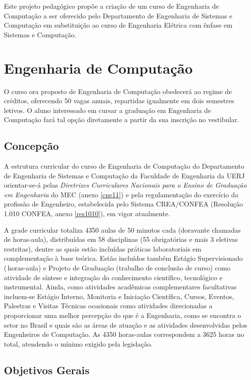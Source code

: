 Este projeto pedagógico propõe a criação de um curso de Engenharia de Computação a ser oferecido pelo Departamento de Engenharia de Sistemas e Computação em substituição ao curso de Engenharia Elétrica com ênfase em Sistemas e Computação.

\chapter{Engenharia de Computação}
O curso ora proposto de Engenharia de Computação obedecerá ao regime de créditos, oferecendo 50 vagas anuais, repartidas igualmente em dois semestres letivos. O aluno interessado em cursar a graduação em Engenharia de Computação fará tal opção diretamente a partir da sua inscrição no vestibular.

\section{Concepção}

A estrutura curricular do curso de Engenharia de Computação do Departamento de Engenharia de Sistemas e Computação da Faculdade de Engenharia da UERJ orientar-se-á pelas \textit{Diretrizes Curriculares Nacionais para o Ensino de Graduação em Engenharia} do MEC (anexo \ref{cne11}) e pela regulamentação do exercício da profissão de Engenheiro, estabelecida pelo Sistema CREA/CONFEA (Resolução 1.010 CONFEA, anexo \ref{res1010}), em vigor atualmente.

A grade curricular totaliza 4350 aulas de 50 minutos cada (doravante chamadas de horas-aula), distribuídas em 58 disciplinas (55 obrigatórias e mais 3 eletivas restritas), dentre as quais estão incluídas práticas laboratoriais em complementação à base teórica. Estão incluídos também Estágio Supervisionado (\EstSupCH\,horas-aula) e Projeto de Graduação (trabalho de conclusão de curso) como atividade de síntese e integração do conhecimento científico, tecnológico e instrumental. Ainda, como atividades acadêmicas complementares facultativas incluem-se Estágio Interno, Monitoria e Iniciação Científica, Cursos, Eventos, Palestras e Visitas Técnicas ocasionais como atividades direcionadas a proporcionar uma melhor percepção do que é a Engenharia, como se encontra o setor no Brasil e quais são as áreas de atuação e as atividades desenvolvidas pelos Engenheiros de Computação. As 4350 horas-aulas correspondem a 3625 horas no total, atendendo o mínimo exigido pela legislação.

\section{Objetivos Gerais}

